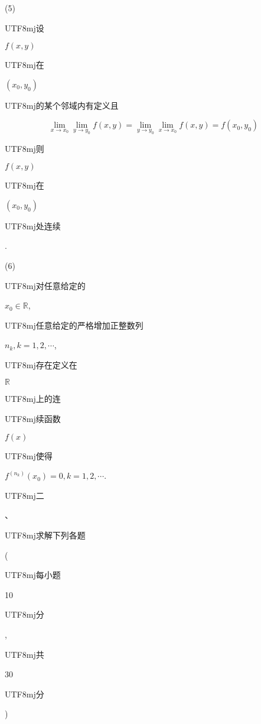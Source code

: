 \documentclass[10pt]{article}
\begin{document}
(5) \begin{CJK}{UTF8}{mj}设\end{CJK} $f(x, y)$ \begin{CJK}{UTF8}{mj}在\end{CJK} $\left(x_{0}, y_{0}\right)$ \begin{CJK}{UTF8}{mj}的某个邻域内有定义且\end{CJK}
$$
\lim _{x \rightarrow x_{0}} \lim _{y \rightarrow y_{0}} f(x, y)=\lim _{y \rightarrow y_{0}} \lim _{x \rightarrow x_{0}} f(x, y)=f\left(x_{0}, y_{0}\right)
$$
\begin{CJK}{UTF8}{mj}则\end{CJK} $f(x, y)$ \begin{CJK}{UTF8}{mj}在\end{CJK} $\left(x_{0}, y_{0}\right)$ \begin{CJK}{UTF8}{mj}处连续\end{CJK}.

(6) \begin{CJK}{UTF8}{mj}对任意给定的\end{CJK} $x_{0} \in \mathbb{R}$, \begin{CJK}{UTF8}{mj}任意给定的严格增加正整数列\end{CJK} $n_{k}, k=1,2, \cdots$, \begin{CJK}{UTF8}{mj}存在定义在\end{CJK} $\mathbb{R}$ \begin{CJK}{UTF8}{mj}上的连\end{CJK} \begin{CJK}{UTF8}{mj}续函数\end{CJK} $f(x)$ \begin{CJK}{UTF8}{mj}使得\end{CJK} $f^{\left(n_{k}\right)}\left(x_{0}\right)=0, k=1,2, \cdots$.

\begin{CJK}{UTF8}{mj}二\end{CJK}、\begin{CJK}{UTF8}{mj}求解下列各题\end{CJK} (\begin{CJK}{UTF8}{mj}每小题\end{CJK} 10 \begin{CJK}{UTF8}{mj}分\end{CJK}, \begin{CJK}{UTF8}{mj}共\end{CJK} 30 \begin{CJK}{UTF8}{mj}分\end{CJK})
\end{document}
